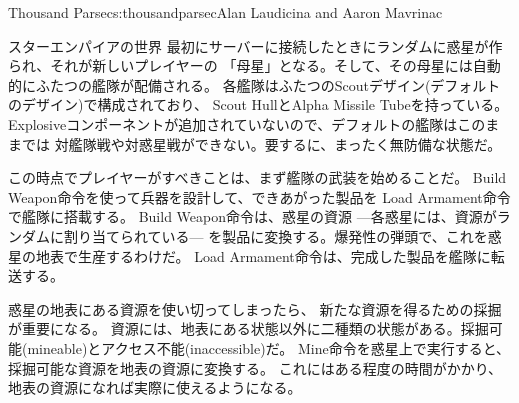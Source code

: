 \begin{aosachapter}{Thousand Parsec}{s:thousandparsec}{Alan Laudicina and Aaron Mavrinac}
\begin{aosasect1}{スターエンパイアの世界}
最初にサーバーに接続したときにランダムに惑星が作られ、それが新しいプレイヤーの
「母星」となる。そして、その母星には自動的にふたつの艦隊が配備される。
各艦隊はふたつのScoutデザイン(デフォルトのデザイン)で構成されており、
Scout HullとAlpha Missile Tubeを持っている。
Explosiveコンポーネントが追加されていないので、デフォルトの艦隊はこのままでは
対艦隊戦や対惑星戦ができない。要するに、まったく無防備な状態だ。


この時点でプレイヤーがすべきことは、まず艦隊の武装を始めることだ。
Build Weapon命令を使って兵器を設計して、できあがった製品を
Load Armament命令で艦隊に搭載する。
Build Weapon命令は、惑星の資源
---各惑星には、資源がランダムに割り当てられている---
を製品に変換する。爆発性の弾頭で、これを惑星の地表で生産するわけだ。
Load Armament命令は、完成した製品を艦隊に転送する。

惑星の地表にある資源を使い切ってしまったら、
新たな資源を得るための採掘が重要になる。
資源には、地表にある状態以外に二種類の状態がある。採掘可能(mineable)とアクセス不能(inaccessible)だ。
Mine命令を惑星上で実行すると、採掘可能な資源を地表の資源に変換する。
これにはある程度の時間がかかり、地表の資源になれば実際に使えるようになる。


\end{aosasect1}
\end{aosachapter}
